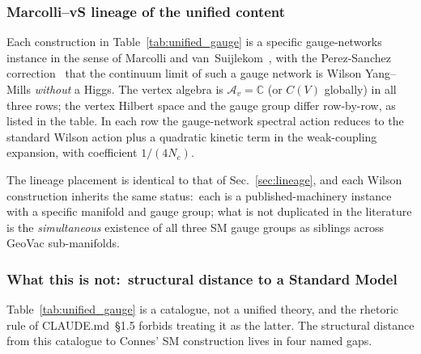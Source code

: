 \documentclass[11pt]{article}
\begin{document}
\subsubsection*{Marcolli--vS lineage of the unified content}

Each construction in Table~\ref{tab:unified_gauge} is a specific
gauge-networks instance in the sense of Marcolli and
van~Suijlekom~\cite{marcolli_vs2014}, with the Perez-Sanchez
correction~\cite{perez_sanchez2024,perez_sanchez2025} that the
continuum limit of such a gauge network is Wilson Yang--Mills
\emph{without} a Higgs.  The vertex algebra is
$\mathcal{A}_v = \mathbb{C}$ (or $C(V)$ globally) in all three rows;
the vertex Hilbert space and the gauge group differ row-by-row, as
listed in the table.  In each row the gauge-network spectral action
reduces to the standard Wilson action plus a quadratic kinetic term
in the weak-coupling expansion, with coefficient $1/(4 N_c)$.

The lineage placement is identical to that of
Sec.~\ref{sec:lineage}, and each Wilson construction inherits the
same status:\ each is a published-machinery instance with a
specific manifold and gauge group; what is not duplicated in the
literature is the \emph{simultaneous} existence of all three SM
gauge groups as siblings across GeoVac sub-manifolds.

\subsubsection*{What this is not:\ structural distance to a Standard Model}

Table~\ref{tab:unified_gauge} is a catalogue, not a unified theory,
and the rhetoric rule of CLAUDE.md~\S 1.5 forbids treating it as the
latter.  The structural distance from this catalogue to Connes' SM
construction lives in four named gaps.
\end{document}
